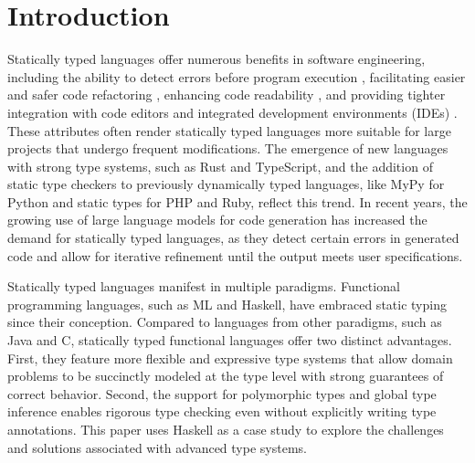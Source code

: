 \documentclass[pdflatex,lineno,sn-nature,Numbered]{sn-jnl}%
\begin{document}
\maketitle

\section{Introduction} \label{sec:introduction}

Statically typed languages offer numerous benefits in software engineering, including the ability to detect errors before program execution \cite{Ray2017-gq,Gao2017-xn}, facilitating easier and safer code refactoring \cite{Kleinschmager2012-bg}, enhancing code readability \cite{Endrikat2014-uz}, and providing tighter integration with code editors and integrated development environments (IDEs) \cite{Mayer2012-ko}. These attributes often render statically typed languages more suitable for large projects that undergo frequent modifications. The emergence of new languages with strong type systems, such as Rust and TypeScript, and the addition of static type checkers to previously dynamically typed languages, like MyPy for Python and static types for PHP and Ruby, reflect this trend. In recent years, the growing use of large language models for code generation has increased the demand for statically typed languages, as they detect certain errors in generated code and allow for iterative refinement until the output meets user specifications.


Statically typed languages manifest in multiple paradigms. Functional programming languages, such as ML and Haskell, have embraced static typing since their conception. Compared to languages from other paradigms, such as Java and C, statically typed functional languages offer two distinct advantages. First, they feature more flexible and expressive type systems that allow domain problems to be succinctly modeled at the type level with strong guarantees of correct behavior. Second, the support for polymorphic types and global type inference enables rigorous type checking even without explicitly writing type annotations. This paper uses Haskell as a case study to explore the challenges and solutions associated with advanced type systems.
\end{document}
